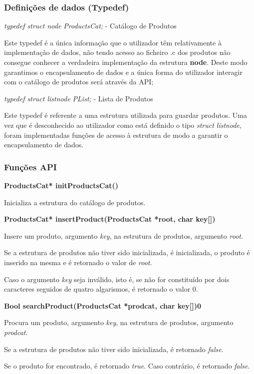 \documentclass[10pt] {article}
\begin{document}
\subsubsection{Definições de dados (Typedef)}
\emph{typedef struct node ProductsCat;} - Catálogo de Produtos
\par Este typedef é a única informação que o utilizador têm relativamente à implementação de dados, não tendo 
acesso ao ficheiro .c dos produtos não consegue conhecer a verdadeira implementação da estrutura \textbf{node}. 
Deste modo garantimos o encapsulamento de dados e a única forma do utilizador interagir com o catálogo de 
produtos será através da API;

\emph{typedef struct listnode PList;} - Lista de Produtos
\par Este typedef é referente a uma estrutura utilizada para guardar produtos. Uma vez que é desconhecido ao
utilizador como está definido o tipo \emph{struct listnode}, foram implementadas funções de acesso à estrutura
de modo a garantir o encapsulamento de dados.

\subsubsection{Funções API}

\noindent \textbf{ProductsCat* initProductsCat()}
\par Inicializa a estrutura do catálogo de produtos.

\noindent \textbf{ProductsCat* insertProduct(ProductsCat *root, char key[])}
\par Insere um produto, argumento \emph{key}, na estrutura de produtos, argumento \emph{root}.
\par Se a estrutura de produtos não tiver sido inicializada, é inicializada, o produto é inserido na mesma e é retornado o valor de \emph{root}.
\par Caso o argumento \emph{key} seja inválido, isto é, se não for constituído por dois caracteres seguidos de quatro algarismos, é retornado o valor 0.

\noindent \textbf{Bool searchProduct(ProductsCat *prodcat, char key[])0}
\par Procura um produto, argumento \emph{key}, na estrutura de produtos, argumento \emph{prodcat}.
\par Se a estrutura de produtos não tiver sido inicializada, é retornado \emph{false}.
\par Se o produto for encontrado, é retornado \emph{true}. Caso contrário, é retornado \emph{false}.
\end{document}
